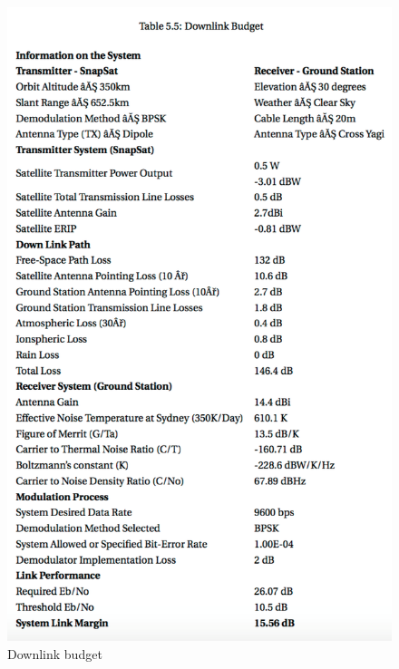 \documentclass[a4paper,12pt]{article}
\begin{document}
\begin{figure}[H]
    \centering
    \includegraphics[width=\linewidth]{./figures/fulldownlink}
    \caption{Downlink budget}
\end{figure}
\end{document}
